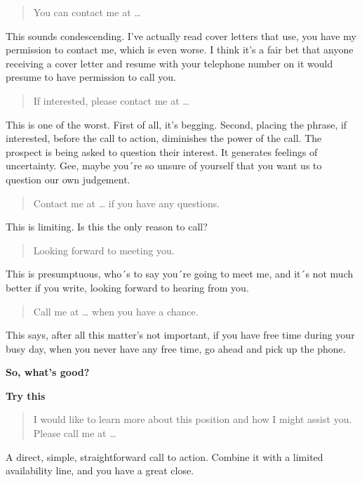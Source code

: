\documentclass[12pt]{article}
\begin{document}
\begin{quote}
You can contact me at \ldots{}
\end{quote}

This sounds condescending. I've actually read cover letters that use,
you have my permission to contact me, which is even worse. I think it's
a fair bet that anyone receiving a cover letter and resume with your
telephone number on it would presume to have permission to call you.

\begin{quote}
If interested, please contact me at \ldots{}
\end{quote}

This is one of the worst. First of all, it's begging. Second, placing
the phrase, if interested, before the call to action, diminishes the
power of the call. The prospect is being asked to question their
interest. It generates feelings of uncertainty. Gee, maybe you´re so
unsure of yourself that you want us to question our own judgement.

\begin{quote}
Contact me at \ldots{} if you have any questions.
\end{quote}

This is limiting. Is this the only reason to call?

\begin{quote}
Looking forward to meeting you.
\end{quote}

This is presumptuous, who´s to say you´re going to meet me, and it´s not
much better if you write, looking forward to hearing from you.

\begin{quote}
Call me at \ldots{} when you have a chance.
\end{quote}

This says, after all this matter's not important, if you have free time
during your busy day, when you never have any free time, go ahead and
pick up the phone.

\textbf{So, what's good?}

\textbf{Try this}

\begin{quote}
I would like to learn more about this position and how I might assist
you. Please call me at \ldots{}
\end{quote}

A direct, simple, straightforward call to action. Combine it with a
limited availability line, and you have a great close.
\end{document}
